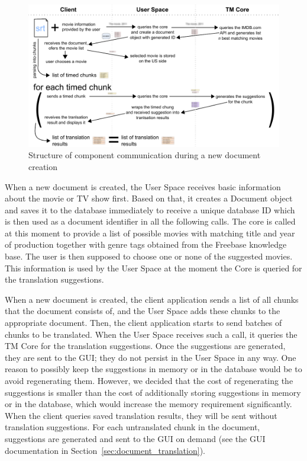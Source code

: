 \begin{figure}
\begin{center}
\includegraphics{figures/creating_document.pdf}
\end{center}
\caption{Structure of component communication during a new document creation}
\end{figure}

When a new document is created, the User Space receives basic information about the movie or TV show first. Based on that, it creates a Document object and saves it to the database immediately to receive a unique database ID which is then used as a document identifier in all the following calls. The core is called at this moment to provide a list of possible movies with matching title and year of production together with genre tags obtained from the Freebase knowledge base. The user is then supposed to choose one or none of the suggested movies. This information is used by the User Space at the moment the Core is queried for the translation suggestions.

When a new document is created, the client application sends a list of all chunks that the document consists of, and the User Space adds these chunks to the appropriate document.
Then, the client application starts to send batches of chunks to be translated. When the User Space receives such a call, it queries the TM Core for the translation suggestions.
Once the suggestions are generated, they are sent to the GUI; they do not persist in the User Space in any way. One reason to possibly keep the suggestions in memory or in the database would be to avoid regenerating them. However, we decided that the cost of regenerating the suggestions is smaller than the cost of additionally storing suggestions in memory or in the database, which would increase the memory requirement significantly. When the client queries saved translation results, they will be sent without translation suggestions. For each untranslated chunk in the document, suggestions are generated and sent to the GUI on demand (see the GUI documentation in Section~\ref{sec:document_translation}).

